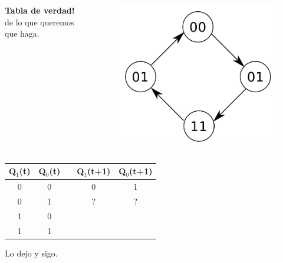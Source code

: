\documentclass[10pt]{beamer}
\begin{document}
\begin{frame}
{\begin{columns}
            \textbf{Tabla de verdad!} de lo que queremos que haga.
              \begin{figure}[h!]
                  \centering
                  \includegraphics[scale=0.2]{ej1.png}
              \end{figure}
      \end{columns}
      \begin{table}[h!]
      \begin{tabular}{|c|c|c|c|c|}
      \hline
      Q$_1$(t) & Q$_0$(t) &  & Q$_1$(t+1) & Q$_0$(t+1) \\ \hline
      0        & 0        &  & 0          & 1          \\ \hline
      0        & 1        &  & ?          & ?          \\ \hline
      1        & 0        &  &           &           \\ \hline
      1        & 1        &  &           &           \\ \hline
      \end{tabular}
      \end{table}
    Lo dejo y sigo.}
\end{frame}
\end{document}
